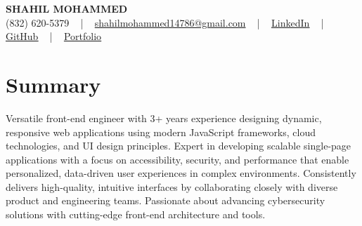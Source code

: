 \documentclass[letterpaper,11pt]{article}
\begin{document}
\begin{center}
    {\fontsize{14pt}{12pt}\selectfont \textbf{\MakeUppercase{Shahil Mohammed}}}\\ \vspace{2pt}
    \fontsize{10pt}{12pt}\selectfont (832) 620-5379 ~ | ~ \href{mailto:shahilmohammed14786@gmail.com}{shahilmohammed14786@gmail.com} ~ | ~  
    \href{https://www.linkedin.com/in/shahil-mohammed-9652931a1/}{\color{blue}\underline{LinkedIn}}  ~ | ~ 
    \href{https://github.com/freakbeast14}{\color{blue}\underline{GitHub}} ~ | ~ 
    \href{https://shahil-mohammed.netlify.app/}{\color{blue}\underline{Portfolio}}
    \vspace{-8pt}
\end{center}

\section{Summary}
\fontsize{9pt}{10pt}\selectfont
Versatile front-end engineer with 3+ years experience designing dynamic, responsive web applications using modern JavaScript frameworks, cloud technologies, and UI design principles. Expert in developing scalable single-page applications with a focus on accessibility, security, and performance that enable personalized, data-driven user experiences in complex environments. Consistently delivers high-quality, intuitive interfaces by collaborating closely with diverse product and engineering teams. Passionate about advancing cybersecurity solutions with cutting-edge front-end architecture and tools.
 \vspace{-5pt}
 
\end{document}
